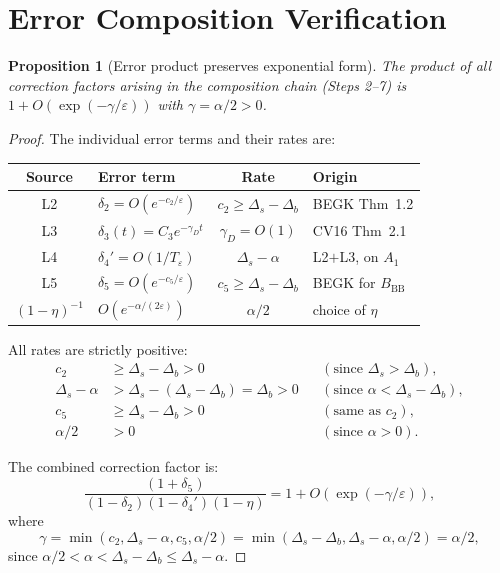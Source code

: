 \documentclass[11pt]{article}
\newtheorem{proposition}{Proposition}
\newcommand{\eps}{\varepsilon}
\newcommand{\Ds}{\Delta_s}
\newcommand{\Db}{\Delta_b}
\newcommand{\BBB}{B_{\mathrm{BB}}}
\newcommand{\Teps}{T_\eps}
\begin{document}
\section{Error Composition Verification}
\label{sec:error-verification}

\begin{proposition}[Error product preserves exponential form]
\label{prop:error-composition}
The product of all correction factors arising in the composition
chain (Steps 2--7) is $1 + O(\exp(-\gamma/\eps))$ with
$\gamma = \alpha/2 > 0$.
\end{proposition}

\begin{proof}
The individual error terms and their rates are:

\medskip
\begin{center}
\renewcommand{\arraystretch}{1.3}
\begin{tabular}{|c|l|c|l|}
\hline
\textbf{Source} & \textbf{Error term} & \textbf{Rate}
  & \textbf{Origin} \\
\hline\hline
L2 & $\delta_2 = O(e^{-c_2/\eps})$
  & $c_2 \geq \Ds - \Db$
  & BEGK Thm~1.2 \\
L3 & $\delta_3(t) = C_3 e^{-\gamma_D t}$
  & $\gamma_D = O(1)$
  & CV16 Thm~2.1 \\
L4 & $\delta_4' = O(1/\Teps)$
  & $\Ds - \alpha$
  & L2$+$L3, on $A_1$ \\
L5 & $\delta_5 = O(e^{-c_5/\eps})$
  & $c_5 \geq \Ds - \Db$
  & BEGK for $\BBB$ \\
$(1-\eta)^{-1}$ & $O(e^{-\alpha/(2\eps)})$
  & $\alpha/2$
  & choice of $\eta$ \\
\hline
\end{tabular}
\end{center}

\medskip\noindent
All rates are strictly positive:
\begin{align*}
  c_2 &\geq \Ds - \Db > 0
    && (\text{since } \Ds > \Db), \\
  \Ds - \alpha &> \Ds - (\Ds - \Db) = \Db > 0
    && (\text{since } \alpha < \Ds - \Db), \\
  c_5 &\geq \Ds - \Db > 0
    && (\text{same as } c_2), \\
  \alpha/2 &> 0
    && (\text{since } \alpha > 0).
\end{align*}

The combined correction factor is:
\[
  \frac{(1 + \delta_5)}
       {(1 - \delta_2)(1 - \delta_4')(1 - \eta)}
  = 1 + O(\exp(-\gamma/\eps)),
\]
where
\begin{equation}\label{eq:gamma-comp}
  \gamma = \min(c_2, \Ds - \alpha, c_5, \alpha/2)
  = \min(\Ds - \Db, \Ds - \alpha, \alpha/2)
  = \alpha/2,
\end{equation}
since $\alpha/2 < \alpha < \Ds - \Db \leq \Ds - \alpha$.


\end{proof}
\end{document}

